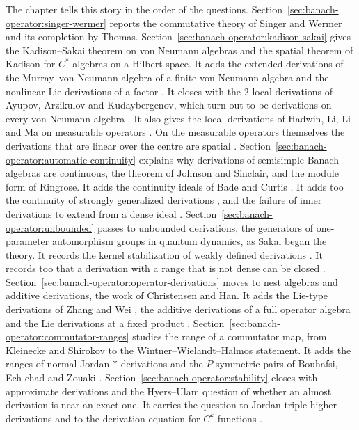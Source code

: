 The chapter tells this story in the order of the questions.
Section~\ref{sec:banach-operator:singer-wermer} reports the commutative
theory of Singer and Wermer and its completion by Thomas.
Section~\ref{sec:banach-operator:kadison-sakai} gives the Kadison--Sakai
theorem on von Neumann algebras and the spatial theorem of Kadison for
$C^*$-algebras on a Hilbert space. It adds the extended derivations of the
Murray--von Neumann algebra of a finite von Neumann algebra
\cite[Theorem~5, p.~2090]{KadisonLiu2014Murray} and the nonlinear Lie
derivations of a factor \cite[Theorem~2.1, p.~1980]{YuZhang2012StarLie}. It
closes with the 2-local derivations
of Ayupov, Arzikulov and Kudaybergenov, which turn out to be derivations on
every von Neumann algebra \cite[Theorem~5, p.~7]{AyupovArzikulov2011TwoLocal}.
It also gives the local derivations of Hadwin, Li, Li and Ma on measurable
operators \cite[Theorem~1, p.~2]{HadwinLiLiMa2013}. On the measurable
operators themselves the derivations that are linear over the centre are
spatial \cite[Theorem~3.9, p.~11]{AlbeverioAyupovKudaybergenov2007}.
Section~\ref{sec:banach-operator:automatic-continuity} explains why
derivations of semisimple Banach algebras are continuous, the theorem of
Johnson and Sinclair, and the module form of Ringrose. It adds the
continuity ideals of Bade and Curtis
\cite[Corollary~2.8, p.~379]{BadeCurtis1974}. It adds too the continuity of
strongly generalized derivations
\cite[Theorem~2.7, p.~5]{HosseiniPark2023}, and the failure of inner
derivations to extend from a dense ideal
\cite[Theorem~4.1, p.~3]{ShafieaslTavakkoli2026}.
Section~\ref{sec:banach-operator:unbounded} passes to unbounded
derivations, the generators of one-parameter automorphism groups in quantum
dynamics, as Sakai began the theory. It records the kernel
stabilization of weakly defined derivations
\cite[Theorem~3.5, p.~7]{Ismert2018Kernel}. It records too that a derivation
with a range that is not dense can be closed
\cite[Theorem~1, p.~181]{Niknam1983Closable}.
Section~\ref{sec:banach-operator:operator-derivations} moves to nest
algebras and additive derivations, the work of Christensen and Han. It adds
the Lie-type derivations of Zhang and Wei
\cite[Theorem~3.1, p.~6]{ZhangWei2017}, the additive derivations of a full
operator algebra \cite[Theorem~2.3, p.~236]{Semrl1991Additive} and the Lie
derivations at a fixed product \cite[Theorem~2.2, p.~81]{LiuHou2025Lie}.
Section~\ref{sec:banach-operator:commutator-ranges} studies the range of a
commutator map, from Kleinecke and Shirokov to the
Wintner--Wielandt--Halmos statement. It adds the ranges of normal Jordan
$*$-derivations \cite[Theorem~1, p.~692]{Molnar1994Range} and the
$P$-symmetric pairs of Bouhafsi, Ech-chad and Zouaki
\cite[Theorem~3.4, p.~149]{BouhafsiEchChadZouaki2022}.
Section~\ref{sec:banach-operator:stability} closes with approximate
derivations and the Hyers--Ulam question of whether an almost derivation is
near an exact one. It carries the question to Jordan triple higher
derivations \cite[Theorem~2.6, p.~1984]{RohJungChang2009Triple} and to the
derivation equation for $C^k$-functions
\cite[Theorem~1, p.~407]{KonigMilman2014Derivation}.

